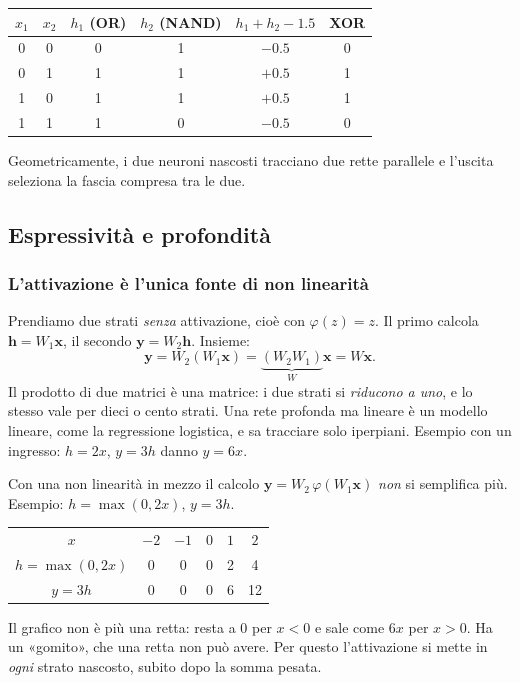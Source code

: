 \documentclass[12pt]{extarticle}
\begin{document}
\begin{center}
\small
\begin{tabular}{cc|cc|cc}
    \toprule
    $x_1$ & $x_2$ & $h_1$ (OR) & $h_2$ (NAND) & $h_1+h_2-1.5$ & XOR \\
    \midrule
    0 & 0 & 0 & 1 & $-0.5$ & 0 \\
    0 & 1 & 1 & 1 & $+0.5$ & 1 \\
    1 & 0 & 1 & 1 & $+0.5$ & 1 \\
    1 & 1 & 1 & 0 & $-0.5$ & 0 \\
    \bottomrule
\end{tabular}
\end{center}
Geometricamente, i due neuroni nascosti tracciano due rette parallele e l'uscita seleziona la fascia compresa tra le due.

\subsection{Espressività e profondità}

\subsubsection{L'attivazione è l'unica fonte di non linearità}

\noindent Prendiamo due strati \emph{senza} attivazione, cioè con $\varphi(z)=z$. Il primo calcola $\mathbf{h}=W_1\mathbf{x}$, il secondo $\mathbf{y}=W_2\mathbf{h}$. Insieme:
\[
\mathbf{y}=W_2(W_1\mathbf{x})=\underbrace{(W_2W_1)}_{W}\mathbf{x}=W\mathbf{x}.
\]
Il prodotto di due matrici è una matrice: i due strati si \emph{riducono a uno}, e lo stesso vale per dieci o cento strati. Una rete profonda ma lineare è un modello lineare, come la regressione logistica, e sa tracciare solo iperpiani. Esempio con un ingresso: $h=2x$, $y=3h$ danno $y=6x$.

\noindent Con una non linearità in mezzo il calcolo $\mathbf{y}=W_2\,\varphi(W_1\mathbf{x})$ \emph{non} si semplifica più. Esempio: $h=\max(0,2x)$, $y=3h$.
\begin{center}
\small
\begin{tabular}{c|ccccc}
    \toprule
    $x$ & $-2$ & $-1$ & $0$ & $1$ & $2$ \\
    $h=\max(0,2x)$ & 0 & 0 & 0 & 2 & 4 \\
    $y=3h$ & 0 & 0 & 0 & 6 & 12 \\
    \bottomrule
\end{tabular}
\end{center}
Il grafico non è più una retta: resta a 0 per $x<0$ e sale come $6x$ per $x>0$. Ha un «gomito», che una retta non può avere. Per questo l'attivazione si mette in \emph{ogni} strato nascosto, subito dopo la somma pesata.
\end{document}
